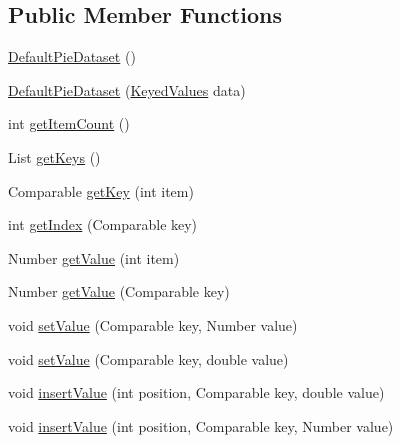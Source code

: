 \subsection*{Public Member Functions}
\begin{DoxyCompactItemize}
\item 
\mbox{\hyperlink{classorg_1_1jfree_1_1data_1_1general_1_1_default_pie_dataset_a2f8886ba3847ba732e4e9fd396f091e7}{Default\+Pie\+Dataset}} ()
\item 
\mbox{\hyperlink{classorg_1_1jfree_1_1data_1_1general_1_1_default_pie_dataset_a2f48710b3db01c65393c40382d792292}{Default\+Pie\+Dataset}} (\mbox{\hyperlink{interfaceorg_1_1jfree_1_1data_1_1_keyed_values}{Keyed\+Values}} data)
\item 
int \mbox{\hyperlink{classorg_1_1jfree_1_1data_1_1general_1_1_default_pie_dataset_a4cf186a9f52bd58498c9f8551f0b5957}{get\+Item\+Count}} ()
\item 
List \mbox{\hyperlink{classorg_1_1jfree_1_1data_1_1general_1_1_default_pie_dataset_a4e5eb908e2e2005625ff71f85ebad97a}{get\+Keys}} ()
\item 
Comparable \mbox{\hyperlink{classorg_1_1jfree_1_1data_1_1general_1_1_default_pie_dataset_afafc2cf6169c3cc0af9c9422023f1b19}{get\+Key}} (int item)
\item 
int \mbox{\hyperlink{classorg_1_1jfree_1_1data_1_1general_1_1_default_pie_dataset_a06709cd535587bc7fed697d3370b81b4}{get\+Index}} (Comparable key)
\item 
Number \mbox{\hyperlink{classorg_1_1jfree_1_1data_1_1general_1_1_default_pie_dataset_af7ed54fb104914f6bc70c5fea2470fdb}{get\+Value}} (int item)
\item 
Number \mbox{\hyperlink{classorg_1_1jfree_1_1data_1_1general_1_1_default_pie_dataset_a6ada21180991dc94b5510b0b6e11e814}{get\+Value}} (Comparable key)
\item 
void \mbox{\hyperlink{classorg_1_1jfree_1_1data_1_1general_1_1_default_pie_dataset_a9b76e9970b368488fc229c3ca034447f}{set\+Value}} (Comparable key, Number value)
\item 
void \mbox{\hyperlink{classorg_1_1jfree_1_1data_1_1general_1_1_default_pie_dataset_a5d0c9ef0aae8f601d3d46c969c6cdbb2}{set\+Value}} (Comparable key, double value)
\item 
void \mbox{\hyperlink{classorg_1_1jfree_1_1data_1_1general_1_1_default_pie_dataset_a1c7ce9c30fb2082770fae1ea60d31ba5}{insert\+Value}} (int position, Comparable key, double value)
\item 
void \mbox{\hyperlink{classorg_1_1jfree_1_1data_1_1general_1_1_default_pie_dataset_aa7b5fb1f754d6683e5e5e4e4ea5b024f}{insert\+Value}} (int position, Comparable key, Number value)

\end{DoxyCompactItemize}
